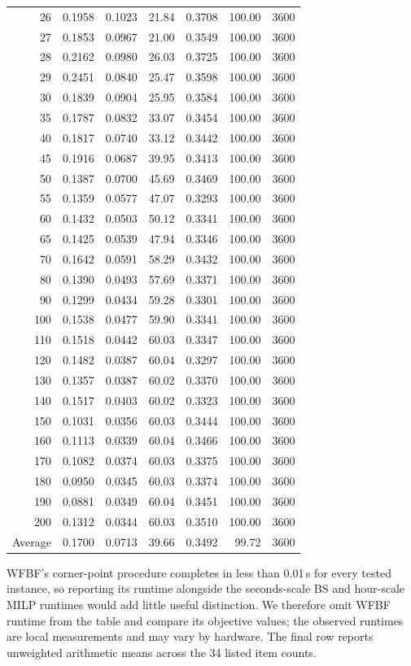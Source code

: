 \begin{table}[htbp]
\begin{tabular}{@{}r@{\quad}r@{\quad}rr@{\quad}rrr@{}}
26  & 0.1958 & 0.1023 & 21.84 & 0.3708 & 100.00 & 3600 \\
27  & 0.1853 & 0.0967 & 21.00 & 0.3549 & 100.00 & 3600 \\
28  & 0.2162 & 0.0980 & 26.03 & 0.3725 & 100.00 & 3600 \\
29  & 0.2451 & 0.0840 & 25.47 & 0.3598 & 100.00 & 3600 \\
30  & 0.1839 & 0.0904 & 25.95 & 0.3584 & 100.00 & 3600 \\
35  & 0.1787 & 0.0832 & 33.07 & 0.3454 & 100.00 & 3600 \\
40  & 0.1817 & 0.0740 & 33.12 & 0.3442 & 100.00 & 3600 \\
45  & 0.1916 & 0.0687 & 39.95 & 0.3413 & 100.00 & 3600 \\
50  & 0.1387 & 0.0700 & 45.69 & 0.3469 & 100.00 & 3600 \\
55  & 0.1359 & 0.0577 & 47.07 & 0.3293 & 100.00 & 3600 \\
60  & 0.1432 & 0.0503 & 50.12 & 0.3341 & 100.00 & 3600 \\
65  & 0.1425 & 0.0539 & 47.94 & 0.3346 & 100.00 & 3600 \\
70  & 0.1642 & 0.0591 & 58.29 & 0.3432 & 100.00 & 3600 \\
80  & 0.1390 & 0.0493 & 57.69 & 0.3371 & 100.00 & 3600 \\
90  & 0.1299 & 0.0434 & 59.28 & 0.3301 & 100.00 & 3600 \\
100 & 0.1538 & 0.0477 & 59.90 & 0.3341 & 100.00 & 3600 \\
110 & 0.1518 & 0.0442 & 60.03 & 0.3347 & 100.00 & 3600 \\
120 & 0.1482 & 0.0387 & 60.04 & 0.3297 & 100.00 & 3600 \\
130 & 0.1357 & 0.0387 & 60.02 & 0.3370 & 100.00 & 3600 \\
140 & 0.1517 & 0.0403 & 60.02 & 0.3323 & 100.00 & 3600 \\
150 & 0.1031 & 0.0356 & 60.03 & 0.3444 & 100.00 & 3600 \\
160 & 0.1113 & 0.0339 & 60.04 & 0.3466 & 100.00 & 3600 \\
170 & 0.1082 & 0.0374 & 60.03 & 0.3375 & 100.00 & 3600 \\
180 & 0.0950 & 0.0345 & 60.03 & 0.3374 & 100.00 & 3600 \\
190 & 0.0881 & 0.0349 & 60.04 & 0.3451 & 100.00 & 3600 \\
200 & 0.1312 & 0.0344 & 60.03 & 0.3510 & 100.00 & 3600 \\
\hline
Average & 0.1700 & 0.0713 & 39.66 & 0.3492 & 99.72 & 3600 \\
\hline
\end{tabular}
\end{table}

WFBF's corner-point procedure completes in less than 0.01\,s for every
tested instance, so reporting its runtime alongside the seconds-scale BS
and hour-scale MILP runtimes would add little useful distinction. We
therefore omit WFBF runtime from the table and compare its objective values;
the observed runtimes are local measurements and may vary by hardware. The
final row reports unweighted arithmetic means across the 34 listed item
counts.
